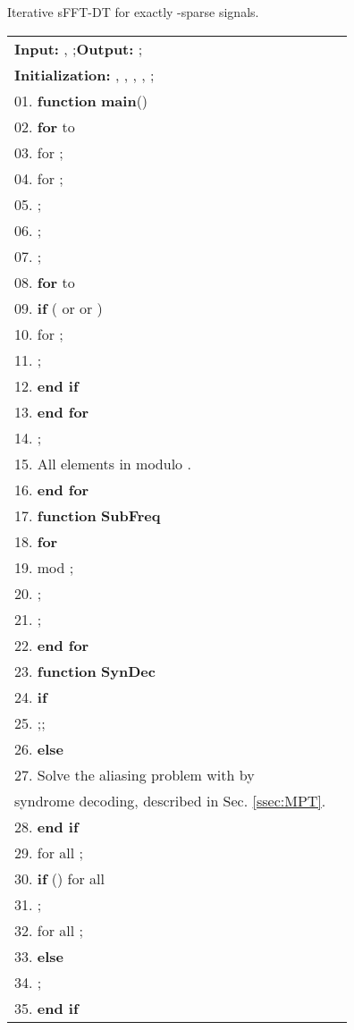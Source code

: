 \documentclass[journal,onecolumn,11pt]{IEEEtran}
\begin{document}
\begin{algorithm}[!htb]
\fontsize{11pt}{0.9em}\selectfont
\setlength{\abovecaptionskip}{0pt}
\setlength{\belowcaptionskip}{0pt}
\caption{Iterative sFFT-DT for exactly -sparse signals.}
\label{Table:our algorithm}
\begin{tabular}[t]{p{17.7cm}l}
\textbf{Input:} , ;\quad \textbf{Output:} ; \\
\textbf{Initialization:} , , , , ; \\
\hline\hline
01. \textbf{function} \textbf{main}()\\
02. \quad\textbf{for}  to  \\
03. \quad\quad  for ;\\
04. \quad\quad  for ;\\
05. \quad\quad ;\\
06. \quad\quad ;\\
07. \quad\quad ;\\
08. \quad\quad \textbf{for}  to \\
09. \quad\quad \quad \textbf{if} ( or  or ) \\
10. \quad\quad \quad \quad  for ; \\
11. \quad\quad \quad \quad ;\\
12. \quad\quad \quad \textbf{end if}\\
13. \quad\quad \textbf{end for} \\
14. \quad\quad ; \\
15. \quad\quad All elements in  modulo .\\
16. \quad\textbf{end for}\\
17. \textbf{function} \textbf{SubFreq} \\
18. \quad \textbf{for} \\
19. \quad \quad  mod ;\\
20. \quad \quad ;\\
21. \quad \quad ;\\
22. \quad \textbf{end for}\\
23. \textbf{function} \textbf{SynDec} \\
24. \quad \textbf{if} \\
25. \quad \quad ;\;\;;\\
26. \quad \textbf{else} \\
27. \quad \quad  Solve the aliasing problem with  by \\
    \quad \quad \quad \;\;syndrome decoding, described in Sec. \ref{ssec:MPT}. \\
28. \quad \textbf{end if} \\
29. \quad  for all ; \\
30. \quad  \textbf{if} ()  for all \\
31. \quad \quad ;\\
32. \quad \quad  for all ;\\
33. \quad \textbf{else} \\
34. \quad \quad  ;\\
35. \quad  \textbf{end if}\\
\hline
\end{tabular}
\end{algorithm}
\normalsize
\end{document}
